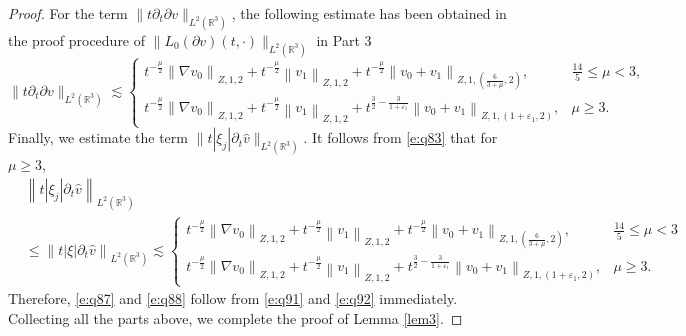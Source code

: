 \documentclass[11pt,twoside]{article}
\newcommand{\R}{\mathbb R}
\newcommand{\p}{\partial}
\newcommand{\f}{\frac}
\theoremstyle{plain}
\theoremstyle{definition}
\theoremstyle{remark}
\numberwithin{equation}{section}
\begin{document}
\begin{proof}
For the term $\|t\p_t\p v\|_{L^2(\R^3)}$, the following estimate has been obtained in the  proof procedure of
$\|L_0(\p v)(t, \cdot)\|_{L^2(\R^3)}$ in Part 3
\begin{equation}\label{e:q91}
\|t\p_t\p v\|_{L^2(\R^3)} \lesssim \begin{cases}t^{-\f{\mu}{2}}\left\|\nabla v_0\right\|_{Z, 1,  2}+t^{-\f{\mu}{2}}\left\| v_1\right\|_{Z, 1,  2}+t^{-\f{\mu}{2}}\left\|v_0+v_1\right\|_{Z, 1,  (\f{6}{3+\mu},2)}, &  \f{14}{5}\leq\mu<3,  \\ t^{-\f{\mu}{2}}\left\|\nabla v_0\right\|_{Z, 1,  2}+t^{-\f{\mu}{2}}\left\| v_1\right\|_{Z, 1,  2}+t^{\f32-\f{3}{1+\varepsilon_1}}\left\|v_0+v_1\right\|_{Z, 1,  (1+\varepsilon_1,2)},
&  \mu\geq3.\end{cases}
\end{equation}
Finally, we estimate the term $\|t|\xi_j|\p_t\hat{v}\|_{L^2(\R^3)}$. It follows from \eqref{e:q83} that for $\mu\geq3$,
\begin{equation}\label{e:q92}
\begin{aligned}
&\left\|t|\xi_j|\p_t\hat{v}\right\|_{L^2(\R^3)}\\&\leq\left\|t|\xi|\p_t\hat{v}\right\|_{L^2(\R^3)}\lesssim\begin{cases} t^{-\f{\mu}{2}}\left\|\nabla v_0\right\|_{Z, 1,  2}+t^{-\f{\mu}{2}}\left\| v_1\right\|_{Z, 1,  2}+t^{-\f{\mu}{2}}\left\|v_0+v_1\right\|_{Z, 1,  (\f{6}{3+\mu},2)},& \f{14}{5}\leq\mu<3\\
t^{-\f{\mu}{2}}\left\|\nabla v_0\right\|_{Z, 1,  2}+t^{-\f{\mu}{2}}\left\| v_1\right\|_{Z, 1,  2}+t^{\f32-\f{3}{1+\varepsilon_1}}\left\|v_0+v_1\right\|_{Z, 1,  (1+\varepsilon_1,2)},& \mu\geq3.
\end{cases}
\end{aligned}
\end{equation}
Therefore, \eqref{e:q87} and \eqref{e:q88} follow from \eqref{e:q91} and \eqref{e:q92} immediately.
Collecting all the parts above, we complete the proof of Lemma \ref{lem3}.
\end{proof}
\end{document}
